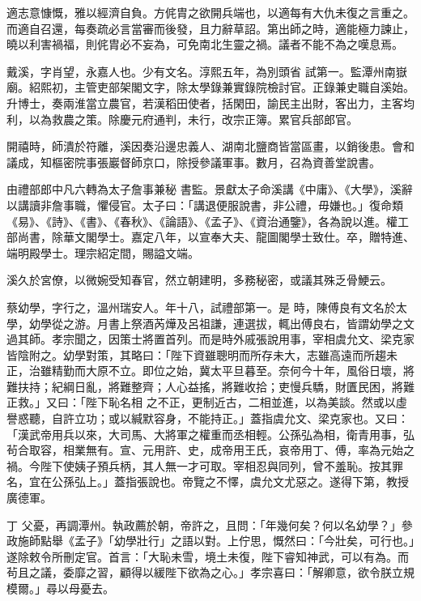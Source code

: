 \begin{pinyinscope}
 適志意慷慨，雅以經濟自負。方侂胄之欲開兵端也，以適每有大仇未復之言重之。而適自召還，每奏疏必言當審而後發，且力辭草詔。第出師之時，適能極力諫止，曉以利害禍福，則侂胄必不妄為，可免南北生靈之禍。議者不能不為之嘆息焉。



 戴溪，字肖望，永嘉人也。少有文名。淳熙五年，為別頭省
 試第一。監潭州南嶽廟。紹熙初，主管吏部架閣文字，除太學錄兼實錄院檢討官。正錄兼史職自溪始。升博士，奏兩淮當立農官，若漢稻田使者，括閑田，諭民主出財，客出力，主客均利，以為救農之策。除慶元府通判，未行，改宗正簿。累官兵部郎官。



 開禧時，師潰於符離，溪因奏沿邊忠義人、湖南北鹽商皆當區畫，以銷後患。會和議成，知樞密院事張巖督師京口，除授參議軍事。數月，召為資善堂說書。



 由禮部郎中凡六轉為太子詹事兼秘
 書監。景獻太子命溪講《中庸》、《大學》，溪辭以講讀非詹事職，懼侵官。太子曰：「講退便服說書，非公禮，毋嫌也。」復命類《易》、《詩》、《書》、《春秋》、《論語》、《孟子》、《資治通鑒》，各為說以進。權工部尚書，除華文閣學士。嘉定八年，以宣奉大夫、龍圖閣學士致仕。卒，贈特進、端明殿學士。理宗紹定間，賜謚文端。



 溪久於宮僚，以微婉受知春官，然立朝建明，多務秘密，或議其殊乏骨鯁云。



 蔡幼學，字行之，溫州瑞安人。年十八，試禮部第一。是
 時，陳傅良有文名於太學，幼學從之游。月書上祭酒芮燁及呂祖謙，連選拔，輒出傅良右，皆謂幼學之文過其師。孝宗聞之，因策士將置首列。而是時外戚張說用事，宰相虞允文、梁克家皆陰附之。幼學對策，其略曰：「陛下資雖聰明而所存未大，志雖高遠而所趨未正，治雖精勤而大原不立。即位之始，冀太平旦暮至。奈何今十年，風俗日壞，將難扶持；紀綱日亂，將難整齊；人心益搖，將難收拾；吏慢兵驕，財匱民困，將難正救。」又曰：「陛下恥名相
 之不正，更制近古，二相並進，以為美談。然或以虛譽惑聽，自許立功；或以緘默容身，不能持正。」蓋指虞允文、梁克家也。又曰：「漢武帝用兵以來，大司馬、大將軍之權重而丞相輕。公孫弘為相，衛青用事，弘茍合取容，相業無有。宣、元用許、史，成帝用王氏，哀帝用丁、傅，率為元始之禍。今陛下使姨子預兵柄，其人無一才可取。宰相忍與同列，曾不羞恥。按其罪名，宜在公孫弘上。」蓋指張說也。帝覽之不懌，虞允文尤惡之。遂得下第，教授廣德軍。



 丁
 父憂，再調潭州。執政薦於朝，帝許之，且問：「年幾何矣？何以名幼學？」參政施師點舉《孟子》「幼學壯行」之語以對。上佇思，慨然曰：「今壯矣，可行也。」遂除敕令所刪定官。首言：「大恥未雪，境土未復，陛下睿知神武，可以有為。而茍且之議，委靡之習，顧得以緩陛下欲為之心。」孝宗喜曰：「解卿意，欲令朕立規模爾。」尋以母憂去。




\end{pinyinscope}

